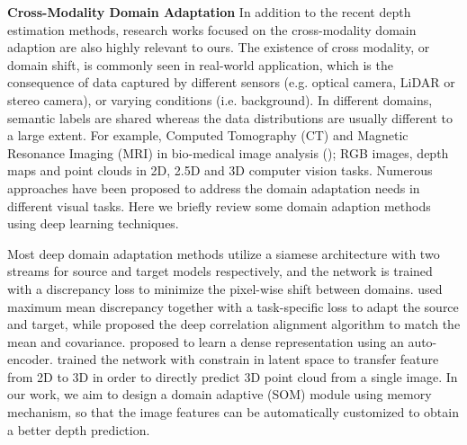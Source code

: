 \documentclass[letterpaper]{article} \usepackage{aaai20}  \usepackage{times}  \usepackage{helvet} \usepackage{courier}  \usepackage{graphicx} \frenchspacing  \setlength{\pdfpagewidth}{8.5in}  \setlength{\pdfpageheight}{11in}  \usepackage{epsfig}
\begin{document}
    \textbf{Cross-Modality Domain Adaptation} \hspace{0.3cm} In addition to the recent depth estimation methods, research works focused on the cross-modality domain adaption are also highly relevant to ours. The existence of cross modality, or domain shift, is commonly seen in real-world application, which is the consequence of data captured by different sensors (e.g. optical camera, LiDAR or stereo camera), or varying conditions (i.e. background). In different domains, semantic labels are shared whereas the data distributions are usually different to a large extent. For example, Computed Tomography (CT) and Magnetic Resonance Imaging (MRI) in bio-medical image analysis (\cite{Dou2018Unsupervised}); RGB images, depth maps and point clouds in 2D, 2.5D and 3D computer vision tasks. Numerous approaches have been proposed to address the domain adaptation needs in different visual tasks. Here we briefly review some domain adaption methods using deep learning techniques.
    
    Most deep domain adaptation methods utilize a siamese architecture with two streams for source and target models respectively, and the network is trained with a discrepancy loss to minimize the pixel-wise shift between domains. \cite{Long2015Learning} used maximum mean discrepancy together with a task-specific loss to adapt the source and target, while \cite{Sun2016Deep} proposed the deep correlation alignment algorithm to match the mean and covariance. \cite{Bloesch_2018_CVPR} proposed to learn a dense representation using an auto-encoder. \cite{Mandikal20183D} trained the network with  constrain in latent space to transfer feature from 2D to 3D in order to directly predict 3D point cloud from a single image. In our work, we aim to design a domain adaptive (SOM) module using memory mechanism, so that the image features can be automatically customized to obtain a better depth prediction. 
   
    
\end{document}
